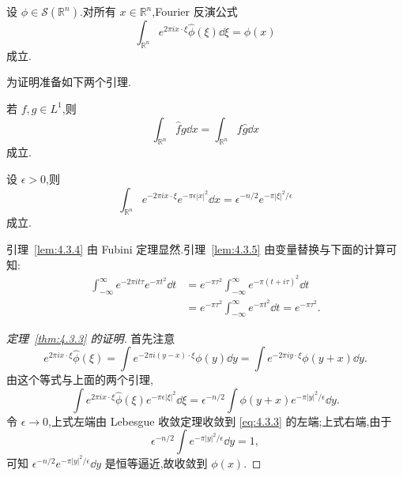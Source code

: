 \begin{theorem}\label{thm:4.3.3}
设 $\phi \in \mathcal{S}(\mathbb{R}^{n})$.对所有 $x \in \mathbb{R}^{n}$,Fourier 反演公式
\begin{equation}
\int_{\mathbb{R}^{n}}e^{2\pi i x\cdot\xi}\hat{\phi}(\xi)\dd\xi = \phi(x)\tag{4.3.3}
\label{eq:4.3.3}\end{equation}
成立.
\end{theorem}

为证明准备如下两个引理.

\begin{lemma}\label{lem:4.3.4}
若 $f, g \in L^{1}$,则
\begin{equation*}
\int_{\mathbb{R}^{n}}\hat{f}g\dd x = \int_{\mathbb{R}^{n}}f\hat{g}\dd x
\end{equation*}
成立.
\end{lemma}

\begin{lemma}\label{lem:4.3.5}
设 $\epsilon > 0$,则
\begin{equation*}
\int_{\mathbb{R}^{n}}e^{-2\pi i x\cdot\xi}e^{-\pi\epsilon|x|^{2}}\dd x = \epsilon^{-n/2}e^{-\pi|\xi|^{2}/\epsilon}
\end{equation*}
成立.
\end{lemma}

引理~\ref{lem:4.3.4} 由 Fubini 定理显然.引理~\ref{lem:4.3.5} 由变量替换与下面的计算可知:
\begin{equation*}
\begin{aligned}
\int_{-\infty}^{\infty}e^{-2\pi i t\tau}e^{-\pi t^{2}}\dd t & = e^{-\pi\tau^{2}}\int_{-\infty}^{\infty}e^{-\pi(t + i\tau)^{2}}\dd t \\
& = e^{-\pi\tau^{2}}\int_{-\infty}^{\infty}e^{-\pi t^{2}}\dd t = e^{-\pi\tau^{2}}.
\end{aligned}
\end{equation*}

\begin{proof}[定理~\ref{thm:4.3.3} 的证明]
首先注意
\begin{equation*}
e^{2\pi i x\cdot\xi}\hat{\phi}(\xi) = \int e^{-2\pi i (y - x)\cdot\xi}\phi(y)\dd y = \int e^{-2\pi i y\cdot\xi}\phi(y + x)\dd y.
\end{equation*}
由这个等式与上面的两个引理,
\begin{equation*}
\int e^{2\pi i x\cdot\xi}\hat{\phi}(\xi)e^{-\pi\epsilon|\xi|^{2}}\dd\xi = \epsilon^{-n/2}\int\phi(y + x)e^{-\pi|y|^{2}/\epsilon}\dd y.
\end{equation*}
令 $\epsilon \to 0$,上式左端由 Lebesgue 收敛定理收敛到 \eqref{eq:4.3.3} 的左端;上式右端,由于
\begin{equation*}
\epsilon^{-n/2}\int e^{-\pi|y|^{2}/\epsilon}\dd y = 1,
\end{equation*}
可知 $\epsilon^{-n/2}e^{-\pi|y|^{2}/\epsilon}\dd y$ 是恒等逼近,故收敛到 $\phi(x)$.
\end{proof}

